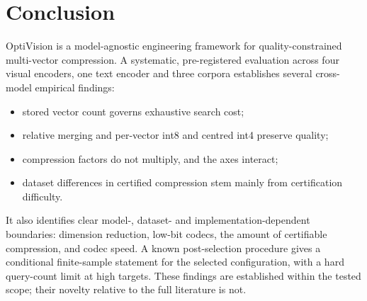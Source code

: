 \documentclass[conference]{IEEEtran}
\begin{document}
\section{Conclusion}

OptiVision is a model-agnostic engineering framework for quality-constrained
multi-vector compression. A systematic, pre-registered evaluation across four visual
encoders, one text encoder and three corpora establishes several cross-model empirical
findings:
\begin{itemize}
\item stored vector count governs exhaustive search cost;
\item relative merging and per-vector int8 and centred int4 preserve quality;
\item compression factors do not multiply, and the axes interact;
\item dataset differences in certified compression stem mainly from certification
difficulty.
\end{itemize}
It also identifies clear model-, dataset- and implementation-dependent boundaries:
dimension reduction, low-bit codecs, the amount of certifiable compression, and codec
speed. A known post-selection procedure gives a conditional finite-sample statement for
the selected configuration, with a hard query-count limit at high targets. These
findings are established within the tested scope; their novelty relative to the full
literature is not.
\end{document}
